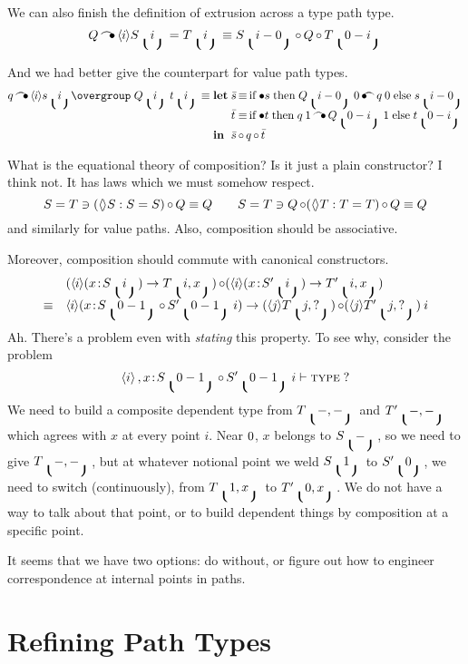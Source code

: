 \documentclass{article}
\begin{document}
We can also finish the definition of extrusion across a type path type.
\[
Q \EXR \IL i {S\PA i \EQ T\PA i} \equiv S\PA{i-\PL}\PC Q \PC T\PA{\PL-i}
\]

And we had better give the counterpart for value path types.
\[
q \EXR \IL i {\VP {Q\PA i} {s\PA{i}} {t\PA{i}}} \equiv
  \begin{array}[t]{@{}l@{\;}l@{\,}c@{\,}l@{}}
      \mathbf{let} & {\bar s} & \equiv & \mbox{if}\;\blob s\;
                           \mbox{then}\; Q\PA{i-\PL}\:\PL \EXL q\:\PL\;\mbox{else}\;s\PA{i-0} \\
                   & {\bar t} & \equiv & \mbox{if}\;\blob t\;
                           \mbox{then}\; q\:\PR \EXR Q\PA{\PL-i}\:\PR \;\mbox{else}\;t\PA{0-i} \\
      \mathbf{in}  & \multicolumn{3}{@{}l}{{\bar s}\PC q \PC {\bar t}}
  \end{array}
\]

What is the equational theory of composition? Is it just a plain constructor?
I think not. It has laws which we must somehow respect.
\[
\HAS {S\EQ T}{(\IL {} S : S\EQ S)\PC Q \equiv Q} \qquad
\HAS {S\EQ T}{Q\PC(\IL {} T : T\EQ T)\PC Q \equiv Q}
\]
and similarly for value paths. Also, composition should be associative.

Moreover, composition should commute with canonical constructors.
\[\begin{array}{ll}
 & (\IL{i}{\PI x {S\PA{i}}{T\PA{i,x}}})\PC
    (\IL{i}{\PI x {S'\PA{i}}{T'\PA{i,x}}}) \\
  \equiv &
  \IL{i}{\PI x {S\PA{0-1}\PC S'\PA{0-1}\:i}{(\IL{j}{T\PA{j,?}})\PC (\IL{j}{T'\PA{j,?}})\:i}}
\end{array}\]
Ah. There's a problem even with \emph{stating} this property. To see why,
consider the problem
\[
  \IA{i},x\hb S\PA{0-1}\PC S'\PA{0-1}\:i \vdash \TYPE ?
\]
We need to build a composite dependent type from $T\lgroup -,- \rgroup$ and
$T'\lgroup -,- \rgroup$ which agrees with $x$ at every point $i$. Near $\PL$, $x$
belongs to $S\lgroup - \rgroup$, so we need to give $T\lgroup -,- \rgroup$, but at whatever
notional point we weld $S\PA{\PR}$ to $S'\PA{\PL}$, we need to switch
(continuously), from $T\PA{\PR,x}$ to $T'\PA{\PL,x}$. We do not have a
way to talk about that point, or to build dependent things by
composition at a specific point.

It seems that we have two options: do without, or figure out how to
engineer correspondence at internal points in paths.


\section{Refining Path Types}
\end{document}
